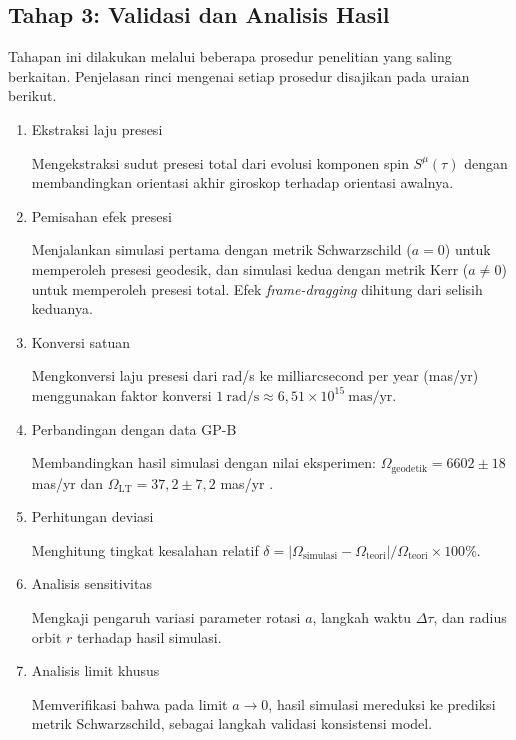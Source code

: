 \subsection{Tahap 3: Validasi dan Analisis Hasil}
\label{subsec:tahap3}

Tahapan ini dilakukan melalui beberapa prosedur penelitian yang saling berkaitan. Penjelasan rinci mengenai setiap prosedur disajikan pada uraian berikut.

\begin{enumerate}[label=\arabic*)]
    \item Ekstraksi laju presesi

    Mengekstraksi sudut presesi total dari evolusi komponen spin $S^\mu(\tau)$ dengan membandingkan orientasi akhir giroskop terhadap orientasi awalnya.

    \item Pemisahan efek presesi

    Menjalankan simulasi pertama dengan metrik Schwarzschild ($a = 0$) untuk memperoleh presesi geodesik, dan simulasi kedua dengan metrik Kerr ($a \neq 0$) untuk memperoleh presesi total. Efek \textit{frame-dragging} dihitung dari selisih keduanya.

    \item Konversi satuan

    Mengkonversi laju presesi dari rad/s ke milliarcsecond per year (mas/yr) menggunakan faktor konversi $1~\text{rad/s} \approx 6{,}51 \times 10^{15}~\text{mas/yr}$.

    \item Perbandingan dengan data GP-B

    Membandingkan hasil simulasi dengan nilai eksperimen: $\Omega_{\text{geodetik}} = 6602 \pm 18$ mas/yr dan $\Omega_{\text{LT}} = 37{,}2 \pm 7{,}2$ mas/yr \parencite{Everitt2011GravityProbeB}.

    \item Perhitungan deviasi

    Menghitung tingkat kesalahan relatif $\delta = |\Omega_{\text{simulasi}} - \Omega_{\text{teori}}|/\Omega_{\text{teori}} \times 100\%$.

    \item Analisis sensitivitas

    Mengkaji pengaruh variasi parameter rotasi $a$, langkah waktu $\Delta\tau$, dan radius orbit $r$ terhadap hasil simulasi.

    \item Analisis limit khusus

    Memverifikasi bahwa pada limit $a \to 0$, hasil simulasi mereduksi ke prediksi metrik Schwarzschild, sebagai langkah validasi konsistensi model.
\end{enumerate}

